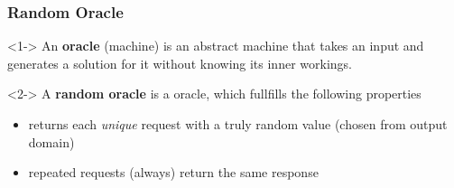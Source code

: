 \begin{frame}
	\frametitle{Random Oracle}

	\begin{definition}[Oracle]<1->
		An \textbf{oracle} (machine) is an abstract machine that takes an input and generates a solution for it without knowing its inner workings.
	\end{definition}
	\begin{definition}<2->
		A \textbf{random oracle} is a oracle, which fullfills the following properties
		\begin{itemize}
			\item returns each \textit{unique} request with a truly random value (chosen from output domain)
			\item repeated requests (always) return the same response
		\end{itemize}
	\end{definition}
\end{frame}